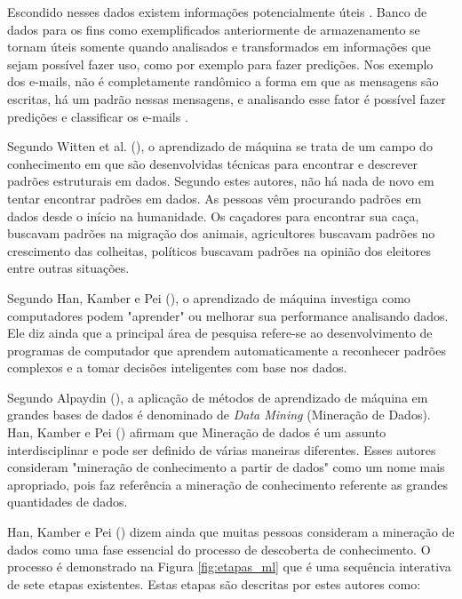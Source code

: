 Escondido nesses dados existem informações potencialmente úteis \cite{Witten:2016:DMF:3086818}. Banco de dados para os fins como exemplificados anteriormente de armazenamento se tornam úteis somente quando analisados e transformados em informações que sejam possível fazer uso, como por exemplo para fazer predições. Nos exemplo dos e-mails, não é completamente randômico a forma em que as mensagens são escritas, há um padrão nessas mensagens, e analisando esse fator é possível fazer predições e classificar os e-mails \cite{Alpaydin:2010:IML:1734076}.

Segundo Witten et al. (\citeyear{Witten:2016:DMF:3086818}), o aprendizado de máquina se trata de um campo do conhecimento em que são desenvolvidas técnicas para encontrar e descrever padrões estruturais em dados. Segundo estes autores, não há nada de novo em tentar encontrar padrões em dados. As pessoas vêm procurando padrões em dados desde o início na humanidade. Os caçadores para encontrar sua caça, buscavam padrões na migração dos animais, agricultores buscavam padrões no crescimento das colheitas, políticos buscavam padrões na opinião dos eleitores entre outras situações.

Segundo Han, Kamber e Pei (\citeyear{Han:2011:DMC:1972541}), o aprendizado de máquina investiga como computadores podem "aprender" ou melhorar sua performance analisando dados. Ele diz ainda que a principal área de pesquisa refere-se ao desenvolvimento de programas de computador que aprendem automaticamente a reconhecer padrões complexos e a tomar decisões inteligentes com base nos dados.

Segundo Alpaydin (\citeyear{Alpaydin:2010:IML:1734076}), a aplicação de métodos de aprendizado de máquina em grandes bases de dados é denominado de \textit{Data Mining} (Mineração de Dados). Han, Kamber e Pei (\citeyear{Han:2011:DMC:1972541}) afirmam que Mineração de dados é um assunto interdisciplinar e pode ser definido de várias maneiras diferentes. Esses autores consideram "mineração de conhecimento a partir de dados" como um nome mais apropriado, pois faz referência a mineração de conhecimento referente as grandes quantidades de dados.

Han, Kamber e Pei (\citeyear{Han:2011:DMC:1972541}) dizem ainda que muitas pessoas consideram a mineração de dados como uma fase essencial do processo de descoberta de conhecimento. O processo é demonstrado na Figura \ref{fig:etapas_ml} que é uma sequência interativa de sete etapas existentes. Estas etapas são descritas por estes autores como:


